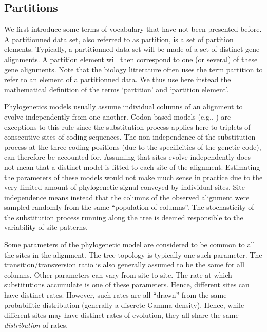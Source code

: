 \documentclass[a4paper,12pt]{article}
\begin{document}
\subsection{Partitions}

We first introduce some terms of vocabulary that have not been presented before. A partitionned data
set, also referred to as partition, is a  set of partition elements.  Typically, a partitionned data
set will be made of  a set of distinct gene alignments. A partition  element will then correspond to
one (or  several) of these gene  alignments. Note that the  biology litterature often uses  the term
partition to refer to an element of a  partitionned data.  We thus use here instead the mathematical
definition of the terms `partition' and `partition element'.

Phylogenetics models usually assume individual columns  of an alignment to evolve independently from
one  another. Codon-based  models (e.g.,  \cite{yang98,yang00b,yang02,guindon04}) are  exceptions to
this rule  since the substitution process  applies here to  triplets of consecutive sites  of coding
sequences.  The non-independence of  the substitution process at the three  coding positions (due to
the specificities of the genetic code), can  therefore be accounted for.  Assuming that sites evolve
independently  does not  mean  that a  distinct  model is  fitted  to each  site  of the  alignment.
Estimating the  parameters of these  models would not  make much sense in  practice due to  the very
limited amount of phylogenetic signal conveyed by individual sites.  Site independence means instead
that the  columns of  the observed  alignment were sampled  randomly from  the same  ``population of
columns''.   The  stochasticity  of the  substitution  process  running  along  the tree  is  deemed
responsible to the variability of site patterns.

Some parameters  of the  phylogenetic model  are considered  to be common  to all  the sites  in the
alignment. The tree topology is typically  one such parameter.  The transition/transversion ratio is
also generally assumed to be the same for all columns.  Other parameters can vary from site to site.
The rate at  which substitutions accumulate is  one of these parameters. Hence,  different sites can
have distinct rates. However,  such rates are all ``drawn'' from  the same probabilitic distribution
(generally a  discrete Gamma  density).  Hence,  while different  sites may  have distinct  rates of
evolution, they all share the same {\em distribution} of rates.
\end{document}
